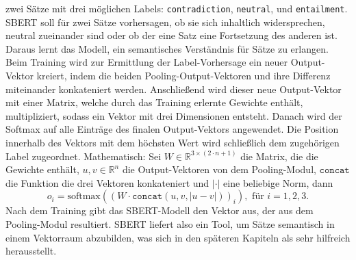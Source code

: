 \documentclass[12pt,letterpaper,ngerman]{article}
\begin{document}
zwei Sätze mit drei möglichen Labels: 
\verb|contradiction|, \verb|neutral|, und \verb|entailment|.
SBERT soll für zwei Sätze vorhersagen, ob sie sich inhaltlich
widersprechen, neutral zueinander sind oder ob der eine Satz
eine Fortsetzung des anderen ist. Daraus lernt das Modell,
ein semantisches Verständnis für Sätze zu erlangen.\\
Beim Training wird zur Ermittlung der Label-Vorhersage ein 
neuer Output-Vektor kreiert, indem die beiden 
Pooling-Output-Vektoren und ihre Differenz miteinander 
konkateniert werden.
Anschließend wird dieser neue Output-Vektor mit einer Matrix,
welche durch das Training erlernte Gewichte enthält, multipliziert, 
sodass ein Vektor mit drei Dimensionen entsteht.
Danach wird der Softmax auf alle Einträge des finalen 
Output-Vektors angewendet. Die Position innerhalb des Vektors
mit dem 
höchsten Wert wird schließlich dem zugehörigen Label zugeordnet.
Mathematisch:
Sei $W \in \mathbb{R}^{3 \times (2\cdot n + 1)}$ die Matrix,
die die Gewichte enthält, 
$u,v \in \mathbb{R}^n$ die Output-Vektoren von dem Pooling-Modul,
$\texttt{concat}$ die Funktion die drei Vektoren konkateniert und
$|\cdot|$ eine beliebige Norm, dann
\[
  o_i = \text{softmax}((W \cdot \texttt{concat}(u,v, |u-v|))_i), \text{ für } i = 1, 2, 3.
\]
Nach dem Training gibt das SBERT-Modell den Vektor aus,  der aus dem
Pooling-Modul resultiert.
SBERT liefert also ein Tool, um Sätze semantisch in einem Vektorraum abzubilden,
was sich in den späteren Kapiteln als sehr hilfreich herausstellt.
\end{document}
